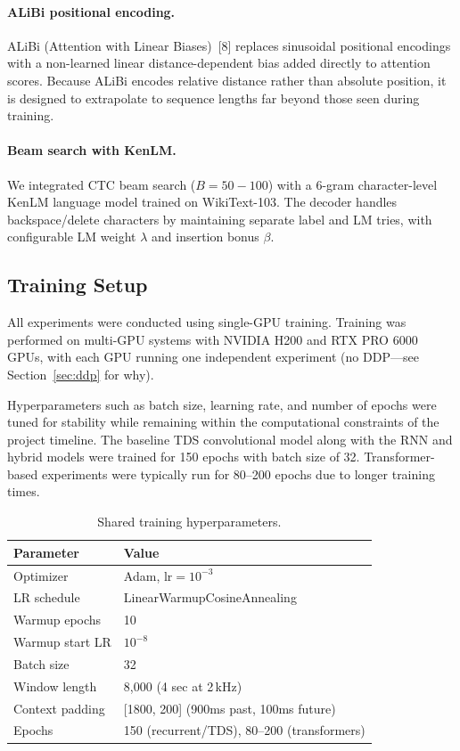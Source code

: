 \documentclass{article}
\begin{document}
\paragraph{ALiBi positional encoding.}
ALiBi (Attention with Linear Biases)~[8] replaces sinusoidal positional encodings with a non-learned linear distance-dependent bias added directly to attention scores. Because ALiBi encodes relative distance rather than absolute position, it is designed to extrapolate to sequence lengths far beyond those seen during training.

\paragraph{Beam search with KenLM.}
We integrated CTC beam search ($B{=}50{-}100$) with a 6-gram character-level KenLM language model trained on WikiText-103. The decoder handles backspace/delete characters by maintaining separate label and LM tries, with configurable LM weight $\lambda$ and insertion bonus $\beta$.

\subsection{Training Setup}

All experiments were conducted using single-GPU training. Training was performed on multi-GPU systems with NVIDIA H200 and RTX PRO 6000 GPUs, with each GPU running one independent experiment (no DDP---see Section~\ref{sec:ddp} for why).

Hyperparameters such as batch size, learning rate, and number of epochs were tuned for stability while remaining within the computational constraints of the project timeline. The baseline TDS convolutional model along with the RNN and hybrid models were trained for 150 epochs with batch size of 32. Transformer-based experiments were typically run for 80--200 epochs due to longer training times.

\begin{table}[h]
\centering
\small
\begin{tabular}{ll}
\toprule
\textbf{Parameter} & \textbf{Value} \\
\midrule
Optimizer & Adam, $\text{lr}{=}10^{-3}$ \\
LR schedule & LinearWarmupCosineAnnealing \\
Warmup epochs & 10 \\
Warmup start LR & $10^{-8}$ \\
Batch size & 32 \\
Window length & 8{,}000 (4 sec at 2\,kHz) \\
Context padding & [1800, 200] (900ms past, 100ms future) \\
Epochs & 150 (recurrent/TDS), 80--200 (transformers) \\
\bottomrule
\end{tabular}
\caption{Shared training hyperparameters.}
\label{tab:hyperparams}
\end{table}
\end{document}
